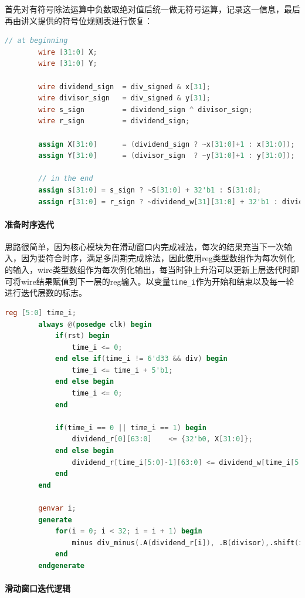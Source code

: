 \documentclass[UTF-8,twoside,c5size]{ctexart}
\begin{document}
	首先对有符号除法运算中负数取绝对值后统一做无符号运算，记录这一信息，最后再由讲义提供的符号位规则表进行恢复：
	
	\begin{lstlisting}[language=verilog]
		// at beginning
		wire [31:0] X;
		wire [31:0] Y;
		
		wire dividend_sign  = div_signed & x[31];
		wire divisor_sign   = div_signed & y[31];
		wire s_sign         = dividend_sign ^ divisor_sign;
		wire r_sign         = dividend_sign;
		
		assign X[31:0]      = (dividend_sign ? ~x[31:0]+1 : x[31:0]);
		assign Y[31:0]      = (divisor_sign  ? ~y[31:0]+1 : y[31:0]);
		
		// in the end
		assign s[31:0] = s_sign ? ~S[31:0] + 32'b1 : S[31:0];
		assign r[31:0] = r_sign ? ~dividend_w[31][31:0] + 32'b1 : dividend_w[31][31:0];
	\end{lstlisting}

	\paragraph{准备时序迭代}\hfill
	
	思路很简单，因为核心模块为在滑动窗口内完成减法，每次的结果充当下一次输入，因为要符合时序，满足多周期完成除法，因此使用reg类型数组作为每次例化的输入，wire类型数组作为每次例化输出，每当时钟上升沿可以更新上层迭代时即可将wire结果赋值到下一层的reg输入。以变量\texttt{time\_i}作为开始和结束以及每一轮进行迭代层数的标志。
	
	\begin{lstlisting}[language=verilog]
		reg [5:0] time_i;
		always @(posedge clk) begin
			if(rst) begin
				time_i <= 0;
			end else if(time_i != 6'd33 && div) begin
				time_i <= time_i + 5'b1;
			end else begin
				time_i <= 0;
			end
			
			if(time_i == 0 || time_i == 1) begin
				dividend_r[0][63:0]    <= {32'b0, X[31:0]};
			end else begin
				dividend_r[time_i[5:0]-1][63:0] <= dividend_w[time_i[5:0]-2][63:0];
			end
		end
		
		genvar i;
		generate
			for(i = 0; i < 32; i = i + 1) begin
				minus div_minus(.A(dividend_r[i]), .B(divisor),.shift(i),.S(S[31-i]),.new_A(dividend_w[i]));
			end
		endgenerate
	\end{lstlisting}

	\paragraph{滑动窗口迭代逻辑}\hfill
	
\end{document}
